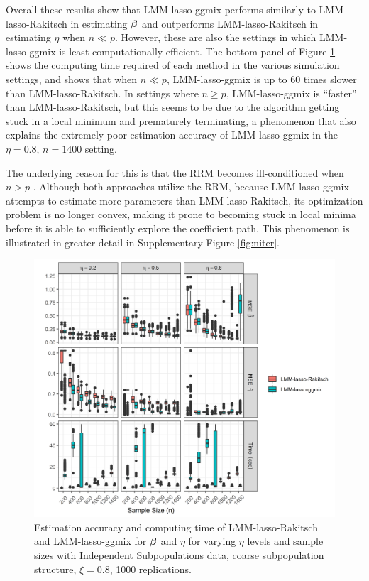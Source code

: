 Overall these results show that LMM-lasso-ggmix performs similarly to LMM-lasso-Rakitsch in estimating $\boldsymbol{\beta}{}$ and outperforms LMM-lasso-Rakitsch in estimating $\eta$ when $n \ll p$. However, these are also the settings in which LMM-lasso-ggmix is least computationally efficient. The bottom panel of Figure \ref{fig:eta_beta_mse} shows the computing time required of each method in the various simulation settings, and shows that when $n \ll p$, LMM-lasso-ggmix is up to 60 times slower than LMM-lasso-Rakitsch. In settings where $n \ge p$, LMM-lasso-ggmix is ``faster'' than LMM-lasso-Rakitsch, but this seems to be due to the algorithm getting stuck in a local minimum and prematurely terminating, a phenomenon that also explains the extremely poor estimation accuracy of LMM-lasso-ggmix in the $\eta=0.8$, $n=1400$ setting.

The underlying reason for this is that the RRM becomes ill-conditioned when $n > p$ \citep{ledoit2004well}. Although both approaches utilize the RRM, because LMM-lasso-ggmix attempts to estimate more parameters than LMM-lasso-Rakitsch, its optimization problem is no longer convex, making it prone to becoming stuck in local minima before it is able to sufficiently explore the coefficient path. This phenomenon is illustrated in greater detail in Supplementary Figure \ref{fig:niter}.

\begin{figure}[H]
    \centering
    \includegraphics[width = \textwidth]{figures/figure_04.png}
     \caption{Estimation accuracy and computing time of LMM-lasso-Rakitsch and LMM-lasso-ggmix for $\boldsymbol{\beta}{}$ and $\eta$ for varying $\eta$ levels and sample sizes with Independent Subpopulations data, coarse subpopulation structure, $\xi = 0.8$, 1000 replications.}
    \label{fig:eta_beta_mse}
\end{figure}

